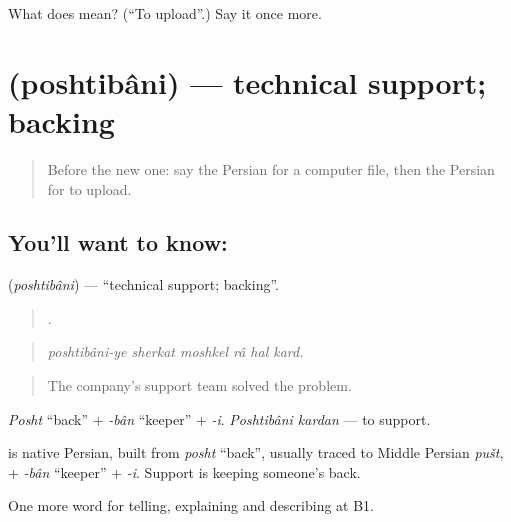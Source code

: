 \begin{tcolorbox}[breakable,colback=teal!4,colframe=teal!35!black,title={Before you move on}]
What does   mean? (\textquotedblleft{}To upload\textquotedblright{}.) Say it once more.
\end{tcolorbox}
\section[\texorpdfstring{\fa{پشتیبانی} (poshtibâni)}{پشتیبانی (poshtibâni)}]{ (poshtibâni) — technical support; backing}

\label{lesson:FA-C418-poshtibani}



\begin{quote}
Before the new one: say the Persian for a computer file, then the Persian for to upload.
\end{quote}

\subsection*{You'll want to know: }
\textbf{} (\emph{poshtibâni}) — \textquotedblleft{}technical support; backing\textquotedblright{}.

\begin{quote}
     .
\end{quote}

\begin{quote}
\emph{poshtibâni-ye sherkat moshkel râ hal kard.}
\end{quote}

\begin{quote}
The company's support team solved the problem.
\end{quote}

\emph{Posht} \textquotedblleft{}back\textquotedblright{} + \emph{-bân} \textquotedblleft{}keeper\textquotedblright{} + \emph{-i}. \emph{Poshtibâni kardan} — to support.

\begin{cousinweb}
\textbf{} is native Persian, built from \emph{posht} \textquotedblleft{}back\textquotedblright{}, usually traced to Middle Persian \emph{pušt}, + \emph{-bân} \textquotedblleft{}keeper\textquotedblright{} + \emph{-i}. Support is keeping someone's back.
\end{cousinweb}

\begin{grammarlens}[title={What you've built}]
One more word for telling, explaining and describing at B1.
\end{grammarlens}

